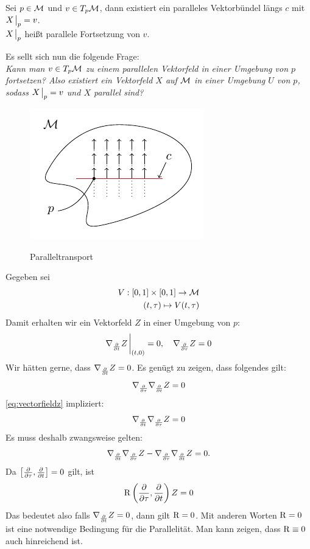 \begin{defs}
Sei $p \in \mathcal{M}$ und $v \in T_p \mathcal{M}$, dann existiert ein paralleles Vektorbündel längs $c$ mit $X\eval_p = v$.\\
$X\eval_p$ heißt parallele Fortsetzung von $v$.
\end{defs}
Es sellt sich nun die folgende Frage:\\
\textit{Kann man $v \in T_p \mathcal{M}$ zu einem parallelen Vektorfeld in einer Umgebung von $p$ fortsetzen?
Also existiert ein Vektorfeld $X$ auf $\mathcal{M}$ in einer Umgebung $U$ von $p$, sodass $X\eval_p = v$ und $X$ parallel sind?}
\begin{figure}[H]
\centering
\includegraphics[width=0.4\linewidth]{figures/tikz/parallel_transport.pdf}
\label{img:parallel_transport}
\caption{Paralleltransport}
\end{figure} 
Gegeben sei 
\begin{align*}
V: [0, 1] \times [0, 1] \to \mathcal{M}\\
(t, \tau) \mapsto V(t, \tau)
\end{align*}
Damit erhalten wir ein Vektorfeld $Z$ in einer Umgebung von $p$:
\begin{align}
\label{eq:vectorfieldz}
\nabla_{\pdv{t}} Z \eval_{(t, 0)} = 0, \quad \nabla_{\pdv{\tau}} Z = 0
\end{align}
Wir hätten gerne, dass $\nabla_{\pdv{t}} Z = 0$.
Es genügt zu zeigen, dass folgendes gilt:
\begin{align*}
\nabla_{\pdv{\tau}}\nabla_{\pdv{t}} Z = 0
\end{align*}
\ref{eq:vectorfieldz} impliziert:
\begin{align*}
\nabla_{\pdv{t}}\nabla_{\pdv{\tau}} Z = 0
\end{align*}
Es muss deshalb zwangsweise gelten:
\begin{align*}
\nabla_{\pdv{t}}\nabla_{\pdv{\tau}} Z - \nabla_{\pdv{\tau}}\nabla_{\pdv{t}} Z = 0.
\end{align*}
Da $\comm{\pdv{\tau}}{\pdv{t}} = 0$ gilt, ist 
\begin{align}
\operatorname{R} \left( \pdv{\tau}, \pdv{t} \right) Z = 0
\end{align} 
Das bedeutet also falls $\nabla_{\pdv{t}}Z = 0$, dann gilt $\operatorname{R} = 0$.
Mit anderen Worten $\operatorname{R} = 0$ ist eine notwendige Bedingung für die Parallelität.
Man kann zeigen, dass $\operatorname{R} \equiv 0$ auch hinreichend ist.\\

